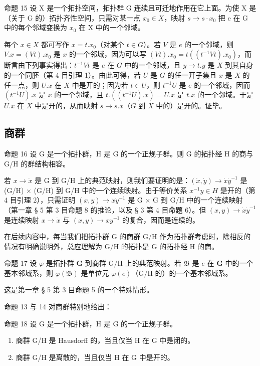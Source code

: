 命题 15 设 X 是一个拓扑空间，拓扑群 G 连续且可迁地作用在它上面。为使 X 是（关于 G 的）拓扑齐性空间，只需对某一点 \(x_{0} \in X\)，映射 \(s \to s \cdot x_{0}\) 把 e 在 G 中的每个邻域变换为 \(x_{0}\) 在 X 中的一个邻域。

每个 \(x \in X\) 都可写作 \(x = t.x_0\)（对某个 \(t \in G\)）。若 \(V\) 是 \(e\) 的一个邻域，则 \(V.x = (Vt).x_0\) 是 \(x\) 的一个邻域，因为可以写 \((Vt).x_0 = t((t^{-1}Vt).x_0)\)，而断言由下列事实得出：\(t^{-1}Vt\) 是 \(e\) 在 \(G\) 中的一个邻域，且 \(y \to t.y\) 是 \(X\) 到其自身的一个同胚（第 4 目引理 1）。由此可得，若 \(U\) 是 \(G\) 的任一开子集且 \(x\) 是 \(X\) 的任一点，则 \(U.x\) 在 \(X\) 中是开的；因为若 \(t \in U\)，则 \(t^{-1}U\) 是 \(e\) 的一个邻域，因而 \((t^{-1}U).x\) 是 \(x\) 的一个邻域，且 \(t.((t^{-1}U).x) = U.x\) 是 \(t.x\) 的一个邻域。于是 \(U.x\) 在 \(X\) 中是开的，从而映射 \(s \to s.x\)（\(G\) 到 \(X\) 中的）是开的。证毕。

\subsection{商群}

命题 16 设 G 是一个拓扑群，H 是 G 的一个正规子群。则 G 的拓扑经 H 的商与 G/H 的群结构相容。

若 \(x \to \dot{x}\) 是 G 到 G/H 上的典范映射，则我们要证明的是：\((\dot{x}, \dot{y}) \to \dot{x}\dot{y}^{-1}\) 是 (G/H) \(\times\) (G/H) 到 G/H 中的一个连续映射。由于等价关系 \(x^{-1}y \in H\) 是开的（第 4 目引理 2），只需证明 \((x,y) \to \dot{x}\dot{y}^{-1}\) 是 G \(\times\) G 到 G/H 中的一个连续映射（第一章 § 5 第 3 目命题 8 的推论，以及 § 3 第 4 目命题 6）。但 \((x,y) \to \dot{x}\dot{y}^{-1}\) 是连续映射 \(x \to \dot{x}\) 与 \((x,y) \to xy^{-1}\) 的复合，因而是连续的。

在后续内容中，每当我们把拓扑群 G 的商群 G/H 作为拓扑群考虑时，除相反的情况有明确说明外，总应理解为 G/H 的拓扑是 G 的拓扑经 H 的商。

命题 17 设 \(\varphi\) 是拓扑群 \(\mathbf{G}\) 到商群 \(\mathrm{G / H}\) 上的典范映射。若 \(\mathfrak{B}\) 是 \(e\) 在 \(\mathbf{G}\) 中的一个基本邻域系，则 \(\varphi(\mathfrak{B})\) 是单位元 \(\varphi(e)\)（\(\mathrm{G / H}\) 的）的一个基本邻域系。

这是第一章 § 5 第 3 目命题 5 的一个特殊情形。

命题 13 与 14 对商群特别地给出：

命题 18 设 G 是一个拓扑群，H 是 G 的一个正规子群。

\begin{enumerate}
\def\labelenumi{\alph{enumi})}
\item
  商群 G/H 是 Hausdorff 的，当且仅当 H 在 G 中是闭的。
\item
  商群 G/H 是离散的，当且仅当 H 在 G 中是开的。
\end{enumerate}

